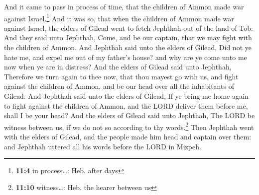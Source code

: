  And it came to pass in process of time, that the children
of Ammon made war against Israel.\footnote{\textbf{11:4} in
  process\ldots: Heb. after days}  And it was so, that
when the children of Ammon made war against Israel, the elders of Gilead
went to fetch Jephthah out of the land of Tob:  And they
said unto Jephthah, Come, and be our captain, that we may fight with the
children of Ammon.  And Jephthah said unto the elders of
Gilead, Did not ye hate me, and expel me out of my father's house? and
why are ye come unto me now when ye are in distress?  And
the elders of Gilead said unto Jephthah, Therefore we turn again to thee
now, that thou mayest go with us, and fight against the children of
Ammon, and be our head over all the inhabitants of Gilead.
 And Jephthah said unto the elders of Gilead, If ye bring
me home again to fight against the children of Ammon, and the LORD
deliver them before me, shall I be your head?  And the
elders of Gilead said unto Jephthah, The LORD be witness between us, if
we do not so according to thy words.\footnote{\textbf{11:10}
  witness\ldots: Heb. the hearer between us}  Then
Jephthah went with the elders of Gilead, and the people made him head
and captain over them: and Jephthah uttered all his words before the
LORD in Mizpeh.

